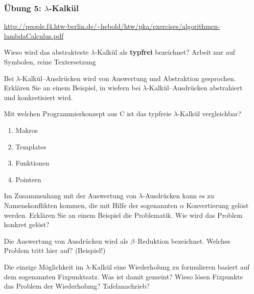 \begin{card}
	\frametitle{Übung 5: $\lambda$-Kalkül}
	\url{http://people.f4.htw-berlin.de/~hebold/htw/pka/exercises/algorithmen-lambdaCalculus.pdf}
\end{card}

\begin{card}
	Wieso wird das abstrakteste $\lambda$-Kalkül als \textbf{typfrei} bezeichnet?
	\hr
	Arbeit nur auf Symbolen, reine Textersetzung
\end{card}

\begin{card}
	Bei $\lambda$-Kalkül–Ausdrücken wird von Auswertung und Abstraktion gesprochen. Erklären Sie an einem Beispiel, in wiefern bei $\lambda$-Kalkül–Ausdrücken abstrahiert und	konkretisiert wird.
	\hr
	
\end{card}

\begin{card}
	Mit welchen Programmierkonzept aus C ist das typfreie $\lambda$-Kalkül vergleichbar? 
	\begin{enumerate}
	\item Makros
	\item Templates
	\item Funktionen
	\item Pointern
	\end{enumerate}
	\hr
\end{card}

\begin{card}
	Im Zusammenhang mit der Auswertung von $\lambda$-Ausdrücken kann es zu Namenskonflikten	kommen, die mit Hilfe der sogenannten
	$\alpha$
	Konvertierung gelöst werden. Erklären Sie an einem Beispiel die Problematik. Wie wird das Problem konkret gelöst?
	\hr
\end{card}

\begin{card}
	Die Auswertung von Ausdrücken wird als $\beta$–Reduktion bezeichnet. Welches Problem tritt hier auf? (Beispiel!)
	\hr
\end{card}

\begin{card}
	Die einzige Möglichkeit im $\lambda$-Kalkül eine Wiederholung zu formulieren basiert auf dem sogenannten Fixpunktsatz. Was ist damit gemeint? Wieso lösen Fixpunkte das Problem der Wiederholung? 
	\hr
	Tafelanachrieb?
\end{card}